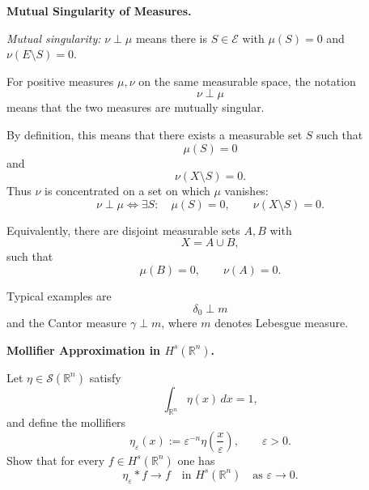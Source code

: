 \begin{problem}[CP-II-0234]
\label{prob:cp-ii-0234}
\textbf{Mutual Singularity of Measures.}

\hspace*{1.5em}\emph{Mutual singularity:} $\nu\perp\mu$ means there is $S\in\mathcal E$ with $\mu(S)=0$ and $\nu(E\setminus S)=0$.
\end{problem}

\begin{solution}
For positive measures \(\mu,\nu\) on the same measurable space, the notation
\[
\nu\perp\mu
\]
means that the two measures are mutually singular.

By definition, this means that there exists a measurable set \(S\) such that
\[
\mu(S)=0
\]
and
\[
\nu(X\setminus S)=0.
\]
Thus \(\nu\) is concentrated on a set on which \(\mu\) vanishes:
\[
\boxed{
\nu\perp\mu
\iff
\exists S:
\quad
\mu(S)=0,\qquad
\nu(X\setminus S)=0.
}
\]

Equivalently, there are disjoint measurable sets \(A,B\) with
\[
X=A\cup B,
\]
such that
\[
\mu(B)=0,
\qquad
\nu(A)=0.
\]

Typical examples are
\[
\delta_0\perp m
\]
and the Cantor measure \(\gamma\perp m\), where \(m\) denotes Lebesgue measure.
\end{solution}


\begin{problem}[CP-II-0235]
\label{prob:cp-ii-0235}
\textbf{Mollifier Approximation in \(H^s(\mathbb{R}^n)\).}

\hspace*{1.5em}Let $\eta \in \mathscr{S}(\mathbb{R}^n)$ satisfy
	\[
	\int_{\mathbb{R}^n} \eta(x)\,dx = 1,
	\]
	and define the mollifiers
	\[
	\eta_\varepsilon(x) := \varepsilon^{-n}\eta\!\left(\frac{x}{\varepsilon}\right),
	\qquad \varepsilon>0.
	\]
	Show that for every $f \in H^{s}(\mathbb{R}^n)$ one has
	\[
	\eta_\varepsilon * f \longrightarrow f
	\quad\text{in } H^{s}(\mathbb{R}^n)
	\quad\text{as } \varepsilon\to 0.
	\]
\end{problem}


